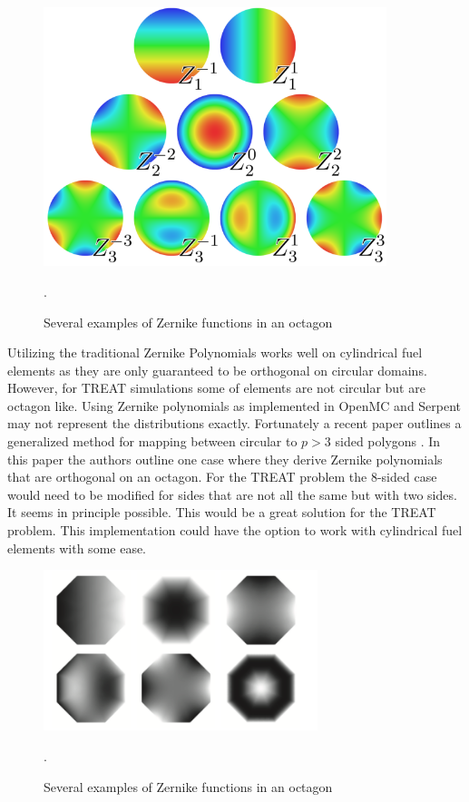 \documentclass[11pt]{article}
\begin{document}
\begin{figure}
    \centering
    \includegraphics[width=10cm]{figures/zernike-circle.png}
    \caption{Several examples of Zernike functions in an octagon \cite{ferreira2015orthogonal}}.
    \label{fig:zernike}
\end{figure}

Utilizing the traditional Zernike Polynomials works well on cylindrical fuel elements as they are only guaranteed to be orthogonal on circular domains.  However, for  TREAT simulations some of elements are not circular but are octagon like.  Using Zernike polynomials as implemented in OpenMC and Serpent may not represent the distributions exactly.  Fortunately a recent paper outlines a generalized method for mapping between circular to $p >3$ sided polygons \cite{ferreira2015orthogonal}.  In this paper the authors outline one case where they derive Zernike polynomials that are orthogonal on an octagon. For the TREAT problem the 8-sided case would need to be modified for sides that are not all the same but with two sides.  It seems in principle possible.  This would be a great solution for the TREAT problem. This implementation could have the option to work with cylindrical fuel elements with some ease.   

\begin{figure}
    \centering
    \includegraphics[width=8cm]{figures/octogon-fet.png}
    \caption{Several examples of Zernike functions in an octagon \cite{ferreira2015orthogonal}}.
    \label{fig:oct-fet}
\end{figure}
\end{document}
